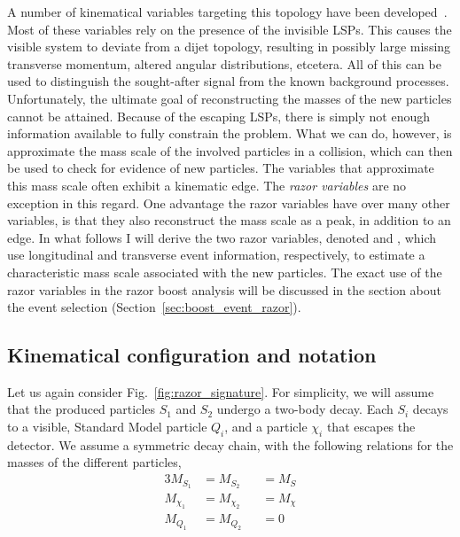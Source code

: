 A number of kinematical variables targeting this topology have been
developed~\cite{Lester:1999tx,Barr:2003rg,Randall:2008rw,Polesello:2009rn,Bai:2012gs}.
Most of these variables rely on the presence of the invisible LSPs. This causes the visible system
to deviate from a dijet topology, resulting in possibly large missing transverse momentum, altered
angular distributions, etcetera. All of this can be used to distinguish the sought-after signal
from the known background processes. 
Unfortunately, the ultimate goal of reconstructing the masses of the new particles cannot be
attained. Because of the escaping LSPs, there is simply not enough information available to fully
constrain the problem. What we can do, however, is approximate the mass scale of the involved
particles in a collision, which can then be used to check for evidence of new particles. 
The variables that approximate this mass scale often exhibit a kinematic edge. 
The \textit{razor variables} \cite{rogan,Rogan:1557072,Chatrchyan:2011ek,Chatrchyan:2014goa} are no
exception in this regard. One advantage the razor variables have over many other variables, is that
they also reconstruct the mass scale as a peak, in addition to an edge. 
In what follows I will derive the two razor variables, denoted \mr and \rsq, which use longitudinal
and transverse event information, respectively, to estimate a characteristic mass scale associated
with the new particles. 
The exact use of the razor variables in the razor boost analysis will be discussed in
the section about the event selection (Section~\ref{sec:boost_event_razor}). 


\subsection{Kinematical configuration and notation \label{sec:razor_notation}}

Let us again consider Fig.~\ref{fig:razor_signature}. For simplicity, we will assume that the
produced particles $S_1$ and $S_2$ undergo a two-body decay. Each $S_i$ decays to a visible,
Standard Model particle $Q_i$, and a particle $\chi_i$ that escapes the detector. 
We assume a symmetric decay chain, with the following relations for the masses of the different
particles,
\begin{alignat}{3}
  M_{S_1} &= M_{S_2} &&= M_S \label{eq:equal_S_masses}\\
  M_{\chi_1} &= M_{\chi_2} &&= M_{\chi} \label{eq:equal_chi_masses}\\
  M_{Q_1} &= M_{Q_2} &&= 0 \label{eq:no_Q_masses}
\end{alignat}

